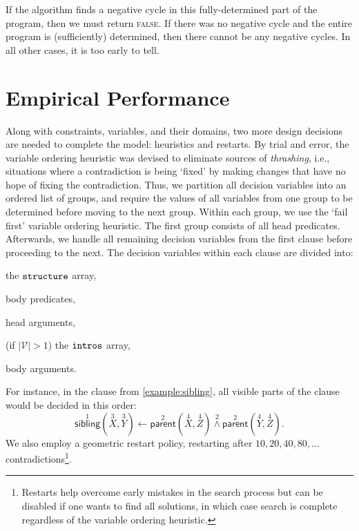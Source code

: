 \documentclass[runningheads]{llncs}
\newcommand{\variable}[1]{\texttt{\textup{#1}}}
\newcommand{\variables}{\mathcal{V}}
\begin{document}
If the algorithm finds a negative cycle in this fully-determined part of the
program, then we must return \textsc{false}. If there was no negative cycle and
the entire program is (sufficiently) determined, then there cannot be any
negative cycles. In all other cases, it is too early to tell.

\section{Empirical Performance} \label{sec:experiments}

Along with constraints, variables, and their domains, two more design decisions
are needed to complete the model: heuristics and restarts. By trial and error,
the variable ordering heuristic was devised to eliminate sources of
\emph{thrashing}, i.e., situations where a contradiction is being `fixed' by
making changes that have no hope of fixing the contradiction. Thus, we partition
all decision variables into an ordered list of groups, and require the values of
all variables from one group to be determined before moving to the next group.
Within each group, we use the `fail first' variable ordering heuristic. The
first group consists of all head predicates. Afterwards, we handle all remaining
decision variables from the first clause before proceeding to the next. The
decision variables within each clause are divided into:
\begin{enumerate*}
\item the $\variable{structure}$ array,
\item body predicates,
\item head arguments,
\item (if $|\variables{}| > 1$) the $\variable{intros}$ array,
\item body arguments.
\end{enumerate*}
For instance, in the clause from \cref{example:sibling}, all visible parts of
the clause would be decided in this order:
\[
  \overset{1}{\mathsf{sibling}}(\overset{3}{X}, \overset{3}{Y}) \gets
  \overset{2}{\mathsf{parent}}(\overset{4}{X}, \overset{4}{Z})
  \overset{2}{\land} \overset{2}{\mathsf{parent}}(\overset{4}{Y},
  \overset{4}{Z}).
\]
We also employ a geometric restart policy, restarting after $10, 20, 40,
80, \dots$ contradictions\footnote{Restarts help overcome early mistakes in the
  search process but can be disabled if one wants to find all solutions, in
  which case search is complete regardless of the variable ordering heuristic.}.
\end{document}
